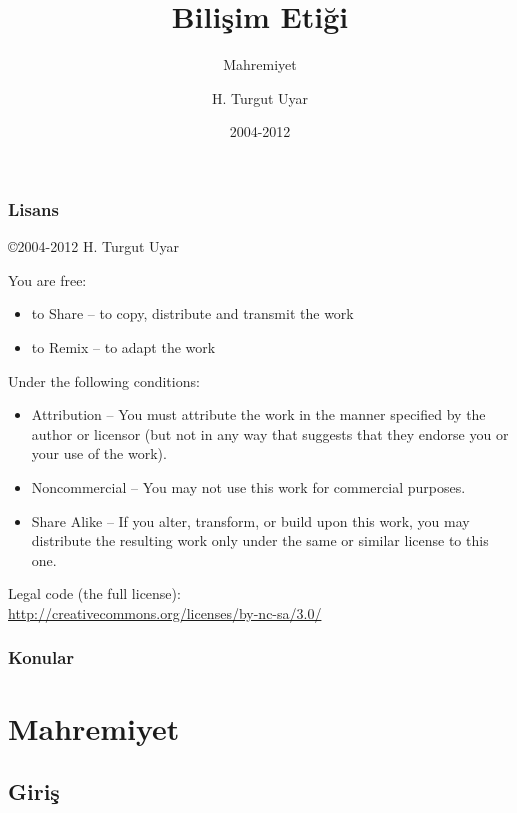 \documentclass[dvipsnames]{beamer}
\title{Bilişim Etiği}
\subtitle{Mahremiyet}
\author{H. Turgut Uyar}
\date{2004-2012}
\theoremstyle{definition}
\theoremstyle{example}
\theoremstyle{plain}
\begin{document}
\begin{frame}
  \titlepage
\end{frame}

\begin{frame}
  \frametitle{Lisans}

  \hfill
  \copyright 2004-2012 H. Turgut Uyar

  \vfill
  \begin{tiny}
    You are free:
    \begin{itemize}
      \item to Share -- to copy, distribute and transmit the work
      \item to Remix -- to adapt the work
    \end{itemize}

    Under the following conditions:
    \begin{itemize}
      \item Attribution -- You must attribute the work in the manner specified by
        the author or licensor (but not in any way that suggests that they
        endorse you or your use of the work).

      \item Noncommercial -- You may not use this work for commercial purposes.

      \item Share Alike -- If you alter, transform, or build upon this work, you
        may distribute the resulting work only under the same or similar license
        to this one.
    \end{itemize}
  \end{tiny}

  \vfill
  Legal code (the full license):\\
  \url{http://creativecommons.org/licenses/by-nc-sa/3.0/}
\end{frame}

\begin{frame}
  \frametitle{Konular}
  \tableofcontents
\end{frame}

\section{Mahremiyet}

\subsection{Giriş}
\end{document}
